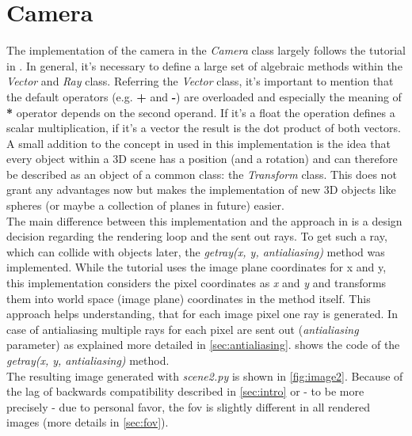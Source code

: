 \documentclass[]{article}
\begin{document}
	\section{Camera}
	\label{sec:camera}
	The implementation of the camera in the \emph{Camera} class largely follows the tutorial in \cite{Shirley2020RTW1}. In general, it’s necessary to define a large set of algebraic methods within the \emph{Vector} and \emph{Ray} class. Referring the \emph{Vector} class, it’s important to mention that the default operators (e.g. \textbf{+} and \textbf{-}) are overloaded and especially the meaning of \textbf{*} operator depends on the second operand. If it’s a float the operation defines a scalar multiplication, if it’s a vector the result is the dot product of both vectors.
	\\
	A small addition to the concept in \cite{Shirley2020RTW1} used in this implementation is the idea that every object within a 3D scene has a position (and a rotation) and can therefore be described as an object of a common class: the \emph{Transform} class. This does not grant any advantages now but makes the implementation of new 3D objects like spheres (or maybe a collection of planes in future) easier.
	\\
	The main difference between this implementation and the approach in \cite{Shirley2020RTW1} is a design decision regarding the rendering loop and the sent out rays. To get such a ray, which can collide with objects later, the \emph{get\textunderscore ray(x, y, antialiasing)} method was implemented. While the tutorial uses the image plane coordinates for x and y, this implementation considers the pixel coordinates as \emph{x} and \emph{y} and transforms them into world space (image plane) coordinates in the method itself. This approach helps understanding, that for each image pixel one ray is generated. In case of antialiasing multiple rays for each pixel are sent out (\emph{antialiasing} parameter) as explained more detailed in \cref{sec:antialiasing}.  shows the code of the \emph{get\textunderscore ray(x, y, antialiasing)} method.
	\\
	The resulting image generated with \emph{scene2.py} is shown in \cref{fig:image2}. Because of the lag of backwards compatibility described in \cref{sec:intro} or - to be more precisely - due to personal favor, the \ac{fov} is slightly different in all rendered images (more details in \cref{sec:fov}). 
\end{document}
